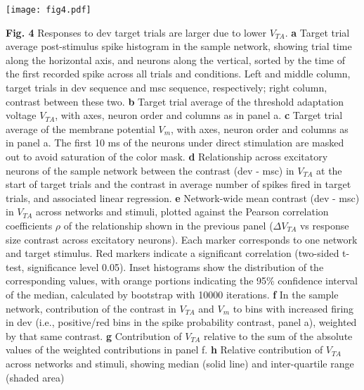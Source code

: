 \documentclass[pdflatex,referee,iicol,sn-basic]{sn-jnl}
\theoremstyle{thmstyleone}%
\theoremstyle{thmstyletwo}%
\theoremstyle{thmstylethree}%
\begin{document}
\begin{figure*}%
    \centering
    \texttt{[image: fig4.pdf]}
    \caption{}
    \label{fig4}
\end{figure*}
\textbf{Fig. 4} Responses to dev target trials are larger due to lower $V_{TA}$.
\textbf{a} Target trial average post-stimulus spike histogram in the sample network, showing trial time along the horizontal axis, and neurons along the vertical, sorted by the time of the first recorded spike across all trials and conditions. Left and middle column, target trials in dev sequence and msc sequence, respectively; right column, contrast between these two.
\textbf{b} Target trial average of the threshold adaptation voltage $V_{TA}$, with axes, neuron order and columns as in panel a.
\textbf{c} Target trial average of the membrane potential $V_m$, with axes, neuron order and columns as in panel a. The first 10 ms of the neurons under direct stimulation are masked out to avoid saturation of the color mask.
\textbf{d} Relationship across excitatory neurons of the sample network between the contrast (dev - msc) in $V_{TA}$ at the start of target trials and the contrast in average number of spikes fired in target trials, and associated linear regression.
\textbf{e} Network-wide mean contrast (dev - msc) in $V_{TA}$ across networks and stimuli, plotted against the Pearson correlation coefficients $\rho$ of the relationship shown in the previous panel ($\Delta V_{TA}$ vs response size contrast across excitatory neurons). Each marker corresponds to one network and target stimulus. Red markers indicate a significant correlation (two-sided t-test, significance level 0.05). Inset histograms show the distribution of the corresponding values, with orange portions indicating the 95\% confidence interval of the median, calculated by bootstrap with 10000 iterations.
\textbf{f} In the sample network, contribution of the contrast in $V_{TA}$ and $V_m$ to bins with increased firing in dev (i.e., positive/red bins in the spike probability contrast, panel a), weighted by that same contrast.
\textbf{g} Contribution of $V_{TA}$ relative to the sum of the absolute values of the weighted contributions in panel f.
\textbf{h} Relative contribution of $V_{TA}$ across networks and stimuli, showing median (solid line) and inter-quartile range (shaded area)
\end{document}
